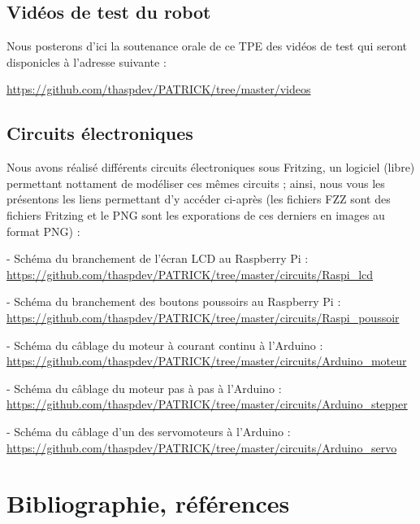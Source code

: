 \documentclass[12pt,a4paper]{article}
\begin{document}
	\subsection{Vidéos de test du robot}
	
\indent\indent Nous posterons d'ici la soutenance orale de ce TPE des vidéos de test qui seront disponicles à l'adresse suivante :
	
	\begin{center}
	\url{https://github.com/thaspdev/PATRICK/tree/master/videos}
	\end{center}
	
	\subsection{Circuits électroniques}
	
\indent\indent Nous avons réalisé différents circuits électroniques sous Fritzing, un logiciel (libre) permettant nottament de modéliser ces mêmes circuits ; ainsi, nous vous les présentons les liens permettant d'y accéder ci-après (les fichiers FZZ sont des fichiers Fritzing et le PNG sont les exporations de ces derniers en images au format PNG) :
	
	- Schéma du branchement de l'écran LCD au Raspberry Pi : \url{https://github.com/thaspdev/PATRICK/tree/master/circuits/Raspi_lcd}
	
	- Schéma du branchement des boutons poussoirs au Raspberry Pi : \url{https://github.com/thaspdev/PATRICK/tree/master/circuits/Raspi_poussoir}
	
	- Schéma du câblage du moteur à courant continu à l'Arduino : \url{https://github.com/thaspdev/PATRICK/tree/master/circuits/Arduino_moteur}
	
	- Schéma du câblage du moteur pas à pas à l'Arduino : \url{https://github.com/thaspdev/PATRICK/tree/master/circuits/Arduino_stepper}
	
	- Schéma du câblage d'un des servomoteurs à l'Arduino : \url{https://github.com/thaspdev/PATRICK/tree/master/circuits/Arduino_servo}
\newpage
	
	\section{Bibliographie, références}
	
	\listoffigures
	
	\listoftables
	
\end{document}
